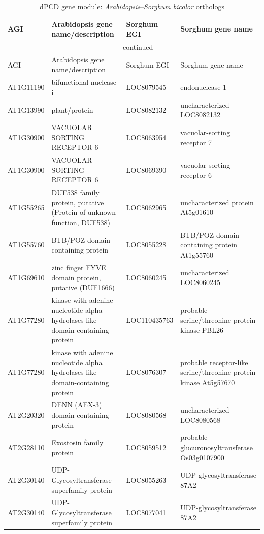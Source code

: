 \begin{longtable}{l p{5.5cm} l p{4.5cm}}
    \caption{dPCD gene module: \textit{Arabidopsis}--\textit{Sorghum bicolor} orthologs} \label{tab:dpcd-broad} \\
    \toprule
    AGI & Arabidopsis gene name/description & Sorghum EGI & Sorghum gene name \\
    \midrule
    \endfirsthead
    \multicolumn{4}{c}{\tablename\ \thetable{} -- continued} \\
    \toprule
    AGI & Arabidopsis gene name/description & Sorghum EGI & Sorghum gene name \\
    \midrule
    \endhead
    \bottomrule
    \endfoot
    AT1G11190 & bifunctional nuclease i & LOC8079545 & endonuclease 1 \\
        AT1G13990 & plant/protein & LOC8082132 & uncharacterized LOC8082132 \\
        AT1G30900 & VACUOLAR SORTING RECEPTOR 6 & LOC8063954 & vacuolar-sorting receptor 7 \\
        AT1G30900 & VACUOLAR SORTING RECEPTOR 6 & LOC8069390 & vacuolar-sorting receptor 6 \\
        AT1G55265 & DUF538 family protein, putative (Protein of unknown function, DUF538) & LOC8062965 & uncharacterized protein At5g01610 \\
        AT1G55760 & BTB/POZ domain-containing protein & LOC8055228 & BTB/POZ domain-containing protein At1g55760 \\
        AT1G69610 & zinc finger FYVE domain protein, putative (DUF1666) & LOC8060245 & uncharacterized LOC8060245 \\
        AT1G77280 & kinase with adenine nucleotide alpha hydrolases-like domain-containing protein & LOC110435763 & probable serine/threonine-protein kinase PBL26 \\
        AT1G77280 & kinase with adenine nucleotide alpha hydrolases-like domain-containing protein & LOC8076307 & probable receptor-like serine/threonine-protein kinase At5g57670 \\
        AT2G20320 & DENN (AEX-3) domain-containing protein & LOC8080568 & uncharacterized LOC8080568 \\
        AT2G28110 & Exostosin family protein & LOC8059512 & probable glucuronosyltransferase Os03g0107900 \\
        AT2G30140 & UDP-Glycosyltransferase superfamily protein & LOC8055263 & UDP-glycosyltransferase 87A2 \\
        AT2G30140 & UDP-Glycosyltransferase superfamily protein & LOC8077041 & UDP-glycosyltransferase 87A2 \\

\end{longtable}
